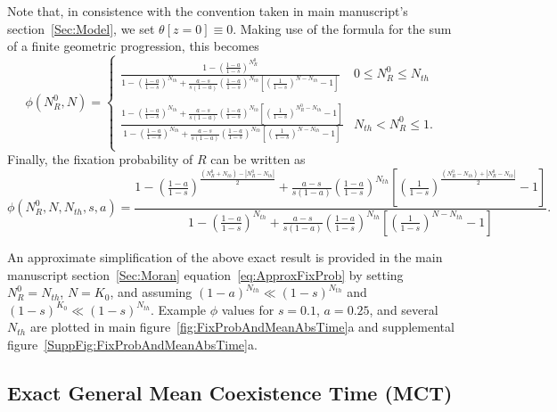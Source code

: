\documentclass{article}
\begin{document}
Note that, in consistence with the convention taken in main manuscript's section~\ref{Sec:Model}, we set \(\theta\left[z=0\right]\equiv0\). Making use of the formula for the sum of a finite geometric progression, this becomes
\begin{equation}
\phi(N_R^0,N)=\begin{cases}
                   \frac{1-\left(\frac{1-a}{1-s}\right)^{N_R^0}}
                   {1-\left(\frac{1-a}{1-s}\right)^{N_{th}}+\frac{a-s}{s(1-a)}\left(\frac{1-a}{1-s}\right)^{N_{th}}
                   \left[\left(\frac{1}{1-s}\right)^{N-N_{th}}-1\right]} & 0\leq N_R^0\leq N_{th}\\
                   \\
                   \frac{1-\left(\frac{1-a}{1-s}\right)^{N_{th}}+\frac{a-s}{s(1-a)}\left(\frac{1-a}{1-s}\right)^{N_{th}}
                   \left[\left(\frac{1}{1-s}\right)^{N_R^0-N_{th}}-1\right]}
                   {1-\left(\frac{1-a}{1-s}\right)^{N_{th}}+\frac{a-s}{s(1-a)}\left(\frac{1-a}{1-s}\right)^{N_{th}}
                   \left[\left(\frac{1}{1-s}\right)^{N-N_{th}}-1\right]} & N_{th}<N_R^0\leq 1. \\
                \end{cases}
    \label{SpecFixProb3}
\end{equation}
Finally, the fixation probability of $R$ can be 
written as
\begin{equation}
\phi\left(N_R^0,N,N_{th},s,a\right)=\frac{1-\left(\frac{1-a}{1-s}\right)^{\frac{\left(N_R^0+N_{th}\right)-\left|N_R^0-N_{th}\right|}{2}}+\frac{a-s}{s(1-a)}\left(\frac{1-a}{1-s}\right)^{N_{th}}\left[\left(\frac{1}{1-s}\right)^{\frac{\left(N_R^0-N_{th}\right)+\left|N_R^0-N_{th}\right|}{2}}-1\right]}
    {1-\left(\frac{1-a}{1-s}\right)^{N_{th}}+\frac{a-s}{s(1-a)}\left(\frac{1-a}{1-s}\right)^{N_{th}}\left[\left(\frac{1}{1-s}\right)^{N-N_{th}}-1\right]}.
    \label{SuppEq:PartFixProb}
\end{equation}

An approximate simplification of the above exact result is provided in the main manuscript section~\ref{Sec:Moran} equation~\eqref{eq:ApproxFixProb} by setting \(N_R^0=N_{th}\), \(N=K_{0}\), and assuming \(\left(1-a\right)^{N_{th}}\ll\left(1-s\right)^{N_{th}}\) and \(\left(1-s\right)^{K_0}\ll\left(1-s\right)^{N_{th}}\). Example \(\phi\) values for \(s=0.1\), \(a=0.25\), and several \(N_{th}\) are plotted in main figure~\ref{fig:FixProbAndMeanAbsTime}a and supplemental figure~\ref{SuppFig:FixProbAndMeanAbsTime}a.

\subsection{Exact General Mean Coexistence Time (MCT)}\label{SuppSec:MeanCoexTime}
\end{document}
